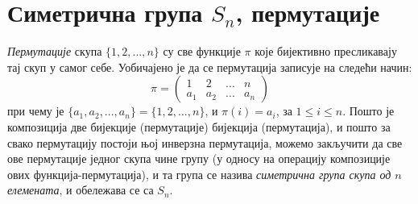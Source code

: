 \documentclass{report}
\theoremstyle{plain}
\theoremstyle{definition}
\begin{document}
\section{Симетрична група $S_n$, пермутације}
\emph{Пермутације} скупа $\{1, 2, ..., n\}$ су све функције $\pi$ које бијективно пресликавају тај скуп у самог себе. Уобичајено је да се пермутација записује на следећи начин:
$$\pi = \begin{pmatrix}
            1 & 2 & ... & n \\
            a_1 & a_2 & ... & a_n
        \end{pmatrix}$$
при чему је $\{a_1, a_2, ..., a_n\} = \{1, 2, ..., n\}$, и $\pi(i) = a_i$, за $1\leq i\leq n$. Пошто је композиција две бијекције (пермутације) бијекција (пермутација), и пошто за свако пермутацију постоји њој инверзна пермутација, можемо закључити да све ове пермутације једног скупа чине групу (у односу на операцију композиције ових функција-пермутација), и та група се назива \emph{симетрична група скупа од $n$ елемената}, и обележава се са $S_n$.
\end{document}
